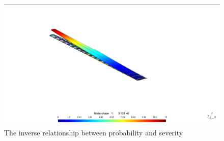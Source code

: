 \begin{figure}[h]
    \centering
    \includegraphics[width=\textwidth]{figures/mode1.jpg}
    \caption{The inverse relationship between probability and severity~\cite{CS-25}}
    \label{fig:inverseRelationship}
\end{figure}




